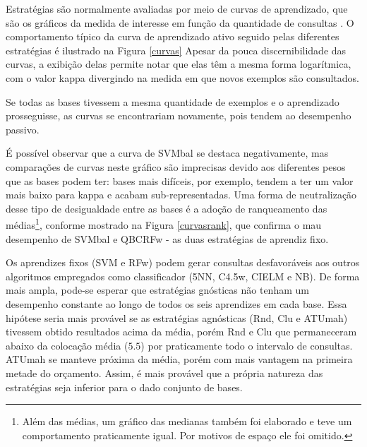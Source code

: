 Estratégias são normalmente avaliadas por meio de curvas de aprendizado,
que são os gráficos da medida de interesse em função da quantidade de consultas
\citep{settles2010active}.
O comportamento típico da curva de aprendizado ativo seguido pelas diferentes estratégias
é ilustrado na Figura \ref{curvas}
Apesar da pouca discernibilidade das curvas, a exibição delas permite notar
que elas têm a mesma forma logarítmica, com o valor kappa divergindo na medida em que novos
exemplos são consultados.

Se todas as bases tivessem a mesma quantidade de exemplos
e o aprendizado prosseguisse, as curvas se encontrariam novamente,
pois tendem ao desempenho passivo.

É possível observar que a curva de SVMbal se destaca negativamente,
mas comparações de curvas neste gráfico são imprecisas devido aos diferentes
pesos que as bases podem ter:
bases mais difíceis, por exemplo, tendem a ter um valor mais baixo para kappa e acabam
sub-representadas.
Uma forma de neutralização desse tipo de desigualdade entre as bases é a adoção
de ranqueamento das médias\footnote{Além das médias,
um gráfico das medianas também foi elaborado e teve um comportamento praticamente igual.
Por motivos de espaço ele foi omitido.}, conforme mostrado na Figura \ref{curvasrank},
que confirma o mau desempenho de SVMbal e QBCRFw - as duas estratégias de aprendiz fixo.

Os aprendizes fixos (SVM e RFw) podem gerar consultas desfavoráveis aos outros algoritmos
empregados como classificador (5NN, C4.5w, CIELM e NB).
De forma mais ampla, pode-se esperar que estratégias gnósticas não tenham um desempenho
constante ao longo de todos os seis aprendizes em cada base.
Essa hipótese seria mais provável se as estratégias agnósticas (Rnd, Clu e ATUmah) tivessem obtido
resultados acima da média, porém Rnd e Clu que permaneceram
abaixo da colocação média ($5.5$) por praticamente todo o intervalo de consultas.
ATUmah se manteve próxima da média, porém com mais vantagem na primeira metade do orçamento.
Assim, é mais provável que a própria natureza das estratégias seja inferior para o dado conjunto de bases.

